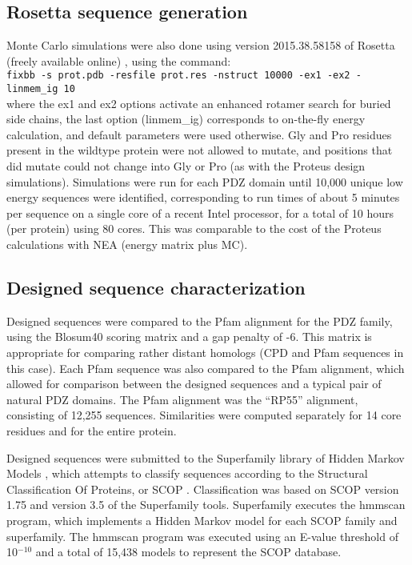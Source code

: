 \documentclass[a4paper,12pt]{article}
\begin{document}
\subsection{Rosetta sequence generation}
Monte Carlo simulations were also done using version 2015.38.58158 of Rosetta (freely available online) \cite{Baker06b},
using the command: \\ \small
\verb~fixbb -s prot.pdb -resfile prot.res -nstruct 10000 -ex1 -ex2 -linmem_ig 10~ \\ \normalsize where the ex1 and ex2 options
activate an enhanced rotamer search for buried side chains, the last option (linmem\_ig) corresponds to on-the-fly energy
calculation, and default parameters were used otherwise. Gly and Pro residues present in the wildtype protein were not
allowed to mutate, and positions that did mutate
could not change into Gly or Pro (as with the Proteus design simulations). Simulations were run for each PDZ domain until
10,000 unique low energy sequences were identified, corresponding to run times of about 5 minutes per sequence on a single
core of a recent Intel processor, for a total of 10 hours (per protein) using 80 cores. This was comparable to the cost of
the Proteus calculations with NEA (energy matrix plus MC).

\subsection{Designed sequence characterization}
Designed sequences were compared to the Pfam alignment for the PDZ family, using the Blosum40 scoring matrix and a
gap penalty of -6. This matrix is appropriate for comparing rather distant homologs (CPD and Pfam sequences in this
case). Each Pfam sequence was also compared to the Pfam alignment, which allowed for comparison between the designed
sequences and a typical pair of natural PDZ domains. The Pfam alignment was the ``RP55'' alignment, consisting of 12,255
sequences. Similarities were computed separately for 14 core residues and for the entire protein.

Designed sequences were submitted to the Superfamily library of Hidden Markov Models \cite{Gough01,Wilson07}, which
attempts to classify sequences according to the Structural Classification Of Proteins, or SCOP \cite{Andreeva04}.
Classification was based on SCOP version 1.75 and version 3.5 of the Superfamily tools. Superfamily executes the hmmscan
program, which implements a Hidden Markov model for each SCOP family and superfamily. The hmmscan program was executed
using an E-value threshold of 10$^{-10}$ and a total of 15,438 models to represent the SCOP database.
\end{document}
